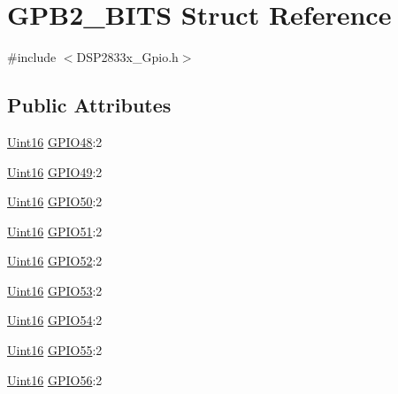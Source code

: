 \hypertarget{struct_g_p_b2___b_i_t_s}{}\section{G\+P\+B2\+\_\+\+B\+I\+T\+S Struct Reference}
\label{struct_g_p_b2___b_i_t_s}


{\ttfamily \#include $<$D\+S\+P2833x\+\_\+\+Gpio.\+h$>$}

\subsection*{Public Attributes}
\begin{DoxyCompactItemize}
\item 
\hyperlink{_d_s_p2833x___device_8h_a59a9f6be4562c327cbfb4f7e8e18f08b}{Uint16} \hyperlink{struct_g_p_b2___b_i_t_s_a76f2236307c6117b250f8355cf0d61b6}{G\+P\+I\+O48}\+:2
\item 
\hyperlink{_d_s_p2833x___device_8h_a59a9f6be4562c327cbfb4f7e8e18f08b}{Uint16} \hyperlink{struct_g_p_b2___b_i_t_s_a56892fb034cc01e0cf4bf9c128498a61}{G\+P\+I\+O49}\+:2
\item 
\hyperlink{_d_s_p2833x___device_8h_a59a9f6be4562c327cbfb4f7e8e18f08b}{Uint16} \hyperlink{struct_g_p_b2___b_i_t_s_a70535372261ee21be2f07bb7e473c7ff}{G\+P\+I\+O50}\+:2
\item 
\hyperlink{_d_s_p2833x___device_8h_a59a9f6be4562c327cbfb4f7e8e18f08b}{Uint16} \hyperlink{struct_g_p_b2___b_i_t_s_a8ac244c61081d7e64fcc7843b54e82ce}{G\+P\+I\+O51}\+:2
\item 
\hyperlink{_d_s_p2833x___device_8h_a59a9f6be4562c327cbfb4f7e8e18f08b}{Uint16} \hyperlink{struct_g_p_b2___b_i_t_s_a73b9be393a689a381560636340f59678}{G\+P\+I\+O52}\+:2
\item 
\hyperlink{_d_s_p2833x___device_8h_a59a9f6be4562c327cbfb4f7e8e18f08b}{Uint16} \hyperlink{struct_g_p_b2___b_i_t_s_a453bccc8b604b48e1a62a9576c9130de}{G\+P\+I\+O53}\+:2
\item 
\hyperlink{_d_s_p2833x___device_8h_a59a9f6be4562c327cbfb4f7e8e18f08b}{Uint16} \hyperlink{struct_g_p_b2___b_i_t_s_af9e5b7a11a80ae506ad98ba0f5146f5d}{G\+P\+I\+O54}\+:2
\item 
\hyperlink{_d_s_p2833x___device_8h_a59a9f6be4562c327cbfb4f7e8e18f08b}{Uint16} \hyperlink{struct_g_p_b2___b_i_t_s_a684d6c1512d39b876b169c2058925543}{G\+P\+I\+O55}\+:2
\item 
\hyperlink{_d_s_p2833x___device_8h_a59a9f6be4562c327cbfb4f7e8e18f08b}{Uint16} \hyperlink{struct_g_p_b2___b_i_t_s_a689cb705ff229af9a40e1d1ec6f70222}{G\+P\+I\+O56}\+:2

\end{DoxyCompactItemize}
